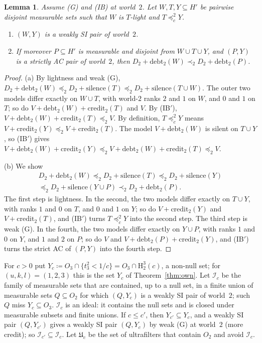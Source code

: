 \documentclass[11pt]{article}
\newtheorem{lemma}[theorem]{Lemma}
\theoremstyle{definition}\newtheorem{definition}[theorem]{Definition}
\theoremstyle{remark}\newtheorem{remark}[theorem]{Remark}
\newcommand{\debt}{\mathrm{debt}}
\newcommand{\cred}{\mathrm{credit}}
\newcommand{\sil}{\mathrm{silence}}
\newcommand{\Iid}{\mathcal I}
\newcommand{\UU}{\mathfrak U}
\newcommand{\Hi}[3]{\mathrm H^{#1}_{#2}(#3)}
\begin{document}
\begin{lemma}\label{lem:buys}
Assume (G) and (IB) at world~$2$. Let $W,T,Y\subseteq H'$ be pairwise
disjoint measurable sets such that $W$ is $T$-light and $T\preceq^2_cY$.
\begin{enumerate}[label=(\alph*),leftmargin=*,itemsep=2pt]
\item $(W,Y)$ is a weakly SI pair of world~$2$.
\item If moreover $P\subseteq H'$ is measurable and disjoint from
$W\cup T\cup Y$, and $(P,Y)$ is a strictly AC pair of world~$2$, then
$D_2+\debt_2(W)\prec_2D_2+\debt_2(P)$.
\end{enumerate}
\end{lemma}
\begin{proof}
(a) By lightness and weak (G),
$D_2+\debt_2(W)\preceq_2D_2+\sil(T)\preceq_2D_2+\sil(T\cup W)$. The outer
two models differ exactly on $W\cup T$, with world-$2$ ranks $2$ and $1$ on
$W$, and $0$ and $1$ on $T$; so do $V+\debt_2(W)+\cred_2(T)$ and $V$. By
(IB$'$), $V+\debt_2(W)+\cred_2(T)\preceq_2V$. By definition,
$T\preceq^2_cY$ means $V+\cred_2(Y)\preceq_2V+\cred_2(T)$. The model
$V+\debt_2(W)$ is silent on $T\cup Y$, so (IB$'$) gives
$V+\debt_2(W)+\cred_2(Y)\preceq_2V+\debt_2(W)+\cred_2(T)\preceq_2V$.

(b) We show
\begin{multline*}
 D_2+\debt_2(W)\preceq_2D_2+\sil(T)\preceq_2D_2+\sil(Y)\\
 \preceq_2D_2+\sil(Y\cup P)\prec_2D_2+\debt_2(P).
\end{multline*}
The first step is lightness. In the second, the two models differ exactly
on $T\cup Y$, with ranks $1$ and $0$ on $T$, and $0$ and $1$ on $Y$; so do
$V+\cred_2(Y)$ and $V+\cred_2(T)$, and (IB$'$) turns $T\preceq^2_cY$ into
the second step. The third step is weak (G). In the fourth, the two models
differ exactly on $Y\cup P$, with ranks $1$ and $0$ on $Y$, and $1$ and $2$
on $P$; so do $V$ and $V+\debt_2(P)+\cred_2(Y)$, and (IB$'$) turns the
strict AC of $(P,Y)$ into the fourth step.
\end{proof}

For $c>0$ put $Y_c\coloneqq O_3\cap\{t^2_3<1/c\}=O_3\cap\Hi32c$, a non-null
set; for $(u,k,l)=(1,2,3)$ this is the set $Y_c$ of Theorem~\ref{thm:own}. Let $\Iid_c$ be the family of measurable sets that are contained, up
to a null set, in a finite union of measurable sets $Q\subseteq O_2$ for
which $(Q,Y_c)$ is a weakly SI pair of world~$2$; such $Q$ miss
$Y_c\subseteq O_3$. $\Iid_c$ is an ideal: it contains the null sets and is
closed under measurable subsets and finite unions. If $c\le c'$, then
$Y_{c'}\subseteq Y_c$, and a weakly SI pair $(Q,Y_{c'})$ gives a weakly SI
pair $(Q,Y_c)$ by weak (G) at world~$2$ (more credit); so
$\Iid_{c'}\subseteq\Iid_c$. Let $\UU_c$ be the set of ultrafilters that
contain $O_2$ and avoid $\Iid_c$.
\end{document}

